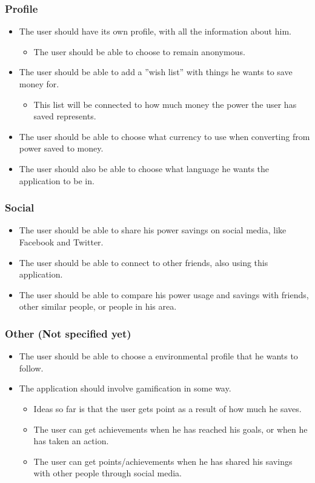 \subsubsection{Profile}

\begin{itemize}
\item The user should have its own profile, with all the information about him.
\begin{itemize}
\item The user should be able to choose to remain anonymous.
\end{itemize}
\item The user should be able to add a ''wish list'' with things he wants to save money for.
\begin{itemize}
\item This list will be connected to how much money the power the user has saved represents.
\end{itemize}
\item The user should be able to choose what currency to use when converting from power saved to money.
\item The user should also be able to choose what language he wants the application to be in.
\end{itemize}


\subsubsection{Social}
\begin{itemize}
\item The user should be able to share his power savings on social media, like Facebook and Twitter.
\item The user should be able to connect to other friends, also using this application.
\item The user should be able to compare his power usage and savings with friends, other similar people, or people in his area.
\end{itemize}

\subsubsection{Other (Not specified yet)}
\begin{itemize}
\item The user should be able to choose a environmental profile that he wants to follow.
\item The application should involve gamification in some way.
\begin{itemize}
\item Ideas so far is that the user gets point as a result of how much he saves.
\item The user can get achievements when he has reached his goals, or when he has taken an action.
\item The user can get points/achievements when he has shared his savings with other people through social media.
\end{itemize}
\end{itemize}


